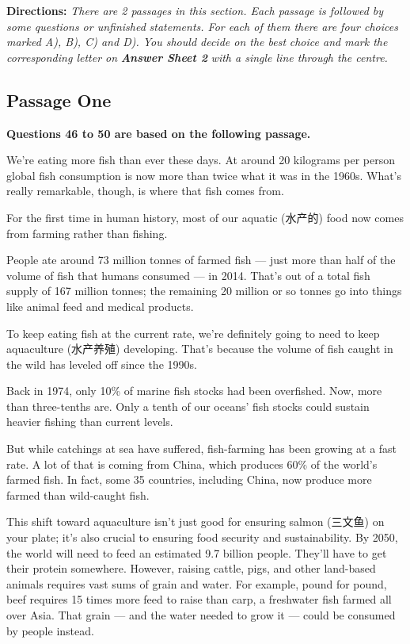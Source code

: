 \documentclass[UTF8,11pt]{ctexart}
\begin{document}
\textbf{Directions: }\textit{There are 2 passages in this section. Each passage is followed by some questions or unfinished} \textit{statements. For each of them there are four choices marked A), B), C) and D). You should decide on the best} \textit{choice and mark the corresponding letter on }\textbf{\textit{Answer Sheet 2}}\textit{ with a single line through the centre.}


\subsection*{\textbf{Passage One}}


\textbf{Questions 46 to 50 are based on the following passage.}


We're eating more fish than ever these days. At around 20 kilograms per person global fish consumption is now more than twice what it was in the 1960s. What's really remarkable, though, is where that fish comes from.


For the first time in human history, most of our aquatic (水产的) food now comes from farming rather than fishing.


People ate around 73 million tonnes of farmed fish — just more than half of the volume of fish that humans consumed — in 2014. That's out of a total fish supply of 167 million tonnes; the remaining 20 million or so tonnes go into things like animal feed and medical products.


To keep eating fish at the current rate, we're definitely going to need to keep aquaculture (水产养殖) developing. That's because the volume of fish caught in the wild has leveled off since the 1990s.


Back in 1974, only 10\% of marine fish stocks had been overfished. Now, more than three-tenths are. Only a tenth of our oceans' fish stocks could sustain heavier fishing than current levels.


But while catchings at sea have suffered, fish-farming has been growing at a fast rate. A lot of that is coming from China, which produces 60\% of the world's farmed fish. In fact, some 35 countries, including China, now produce more farmed than wild-caught fish.


This shift toward aquaculture isn't just good for ensuring salmon (三文鱼) on your plate; it's also crucial to ensuring food security and sustainability. By 2050, the world will need to feed an estimated 9.7 billion people. They'll have to get their protein somewhere. However, raising cattle, pigs, and other land-based animals requires vast sums of grain and water. For example, pound for pound, beef requires 15 times more feed to raise than carp, a freshwater fish farmed all over Asia. That grain — and the water needed to grow it — could be consumed by people instead.
\end{document}
